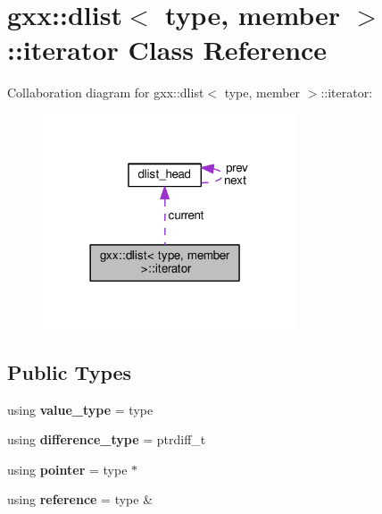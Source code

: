\hypertarget{classgxx_1_1dlist_1_1iterator}{}\section{gxx\+:\+:dlist$<$ type, member $>$\+:\+:iterator Class Reference}
\label{classgxx_1_1dlist_1_1iterator}


Collaboration diagram for gxx\+:\+:dlist$<$ type, member $>$\+:\+:iterator\+:
\nopagebreak
\begin{figure}[H]
\begin{center}
\leavevmode
\includegraphics[width=213pt]{classgxx_1_1dlist_1_1iterator__coll__graph}
\end{center}
\end{figure}
\subsection*{Public Types}
\begin{DoxyCompactItemize}
\item 
using {\bfseries value\+\_\+type} = type\hypertarget{classgxx_1_1dlist_1_1iterator_a09ac3d631bbfb446c7b3292e37ab92c5}{}\label{classgxx_1_1dlist_1_1iterator_a09ac3d631bbfb446c7b3292e37ab92c5}

\item 
using {\bfseries difference\+\_\+type} = ptrdiff\+\_\+t\hypertarget{classgxx_1_1dlist_1_1iterator_a4ac457be7db578c62726fdec02f7f052}{}\label{classgxx_1_1dlist_1_1iterator_a4ac457be7db578c62726fdec02f7f052}

\item 
using {\bfseries pointer} = type $\ast$\hypertarget{classgxx_1_1dlist_1_1iterator_a3158ccd3585b790ff9708ab53a93a03e}{}\label{classgxx_1_1dlist_1_1iterator_a3158ccd3585b790ff9708ab53a93a03e}

\item 
using {\bfseries reference} = type \&\hypertarget{classgxx_1_1dlist_1_1iterator_a18efa1e6446e7523d84196aa906fc19d}{}\label{classgxx_1_1dlist_1_1iterator_a18efa1e6446e7523d84196aa906fc19d}

\end{DoxyCompactItemize}
